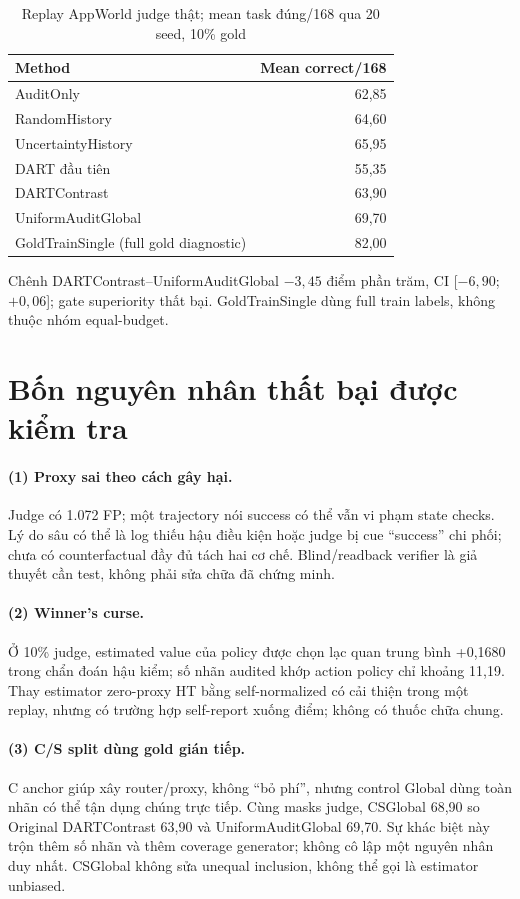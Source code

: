 \documentclass[11pt,a4paper,openany]{book}
\begin{document}
\begin{table}[htbp]\centering\small\caption{Replay AppWorld judge thật; mean task đúng/168 qua 20 seed, 10\% gold}\label{tab:dartfirst}\begin{tabular}{lr}\toprule Method & Mean correct/168\\\midrule AuditOnly & 62,85\\ RandomHistory & 64,60\\ UncertaintyHistory & 65,95\\ DART đầu tiên & 55,35\\ DARTContrast & 63,90\\ UniformAuditGlobal & 69,70\\ GoldTrainSingle (full gold diagnostic) & 82,00\\\bottomrule\end{tabular}\end{table}
Chênh DARTContrast--UniformAuditGlobal \(-3,45\) điểm phần trăm, CI [\(-6,90\);\(+0,06\)]; gate superiority thất bại. GoldTrainSingle dùng full train labels, không thuộc nhóm equal-budget.

\section{Bốn nguyên nhân thất bại được kiểm tra}
\paragraph{(1) Proxy sai theo cách gây hại.} Judge có 1.072 FP; một trajectory nói success có thể vẫn vi phạm state checks. Lý do sâu có thể là log thiếu hậu điều kiện hoặc judge bị cue ``success'' chi phối; chưa có counterfactual đầy đủ tách hai cơ chế. Blind/readback verifier là giả thuyết cần test, không phải sửa chữa đã chứng minh.
\paragraph{(2) Winner's curse.} Ở 10\% judge, estimated value của policy được chọn lạc quan trung bình +0,1680 trong chẩn đoán hậu kiểm; số nhãn audited khớp action policy chỉ khoảng 11,19. Thay estimator zero-proxy HT bằng self-normalized có cải thiện trong một replay, nhưng có trường hợp self-report xuống điểm; không có thuốc chữa chung.
\paragraph{(3) C/S split dùng gold gián tiếp.} C anchor giúp xây router/proxy, không ``bỏ phí'', nhưng control Global dùng toàn nhãn có thể tận dụng chúng trực tiếp. Cùng masks judge, CSGlobal 68,90 so Original DARTContrast 63,90 và UniformAuditGlobal 69,70. Sự khác biệt này trộn thêm số nhãn và thêm coverage generator; không cô lập một nguyên nhân duy nhất. CSGlobal không sửa unequal inclusion, không thể gọi là estimator unbiased.
\end{document}
